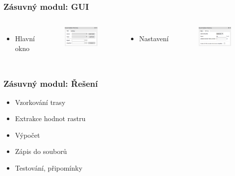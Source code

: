 \documentclass{beamer}
\begin{document}
\begin{frame}
\frametitle{Zásuvný modul: GUI}
\begin{columns}
	\begin{itemize}
		\item Hlavní okno
	\end{itemize}
\begin{figure}[H] \centering
		\includegraphics[scale=0.55]{./pictures/gui_main.png}
\end{figure}

	\begin{itemize}
		\item Nastavení
	\end{itemize}
\begin{figure}[H] \centering
		\includegraphics[scale=0.55]{./pictures/gui_settings.png}
\end{figure}


	
\end{columns}
\end{frame}

\begin{frame}
\frametitle{Zásuvný modul: Řešení}

\begin{itemize}
	\item Vzorkování trasy
	\item Extrakce hodnot rastru
	\item Výpočet
	\item Zápis do souborů
	\item Testování, připomínky
\end{itemize}



\end{frame}
\end{document}
